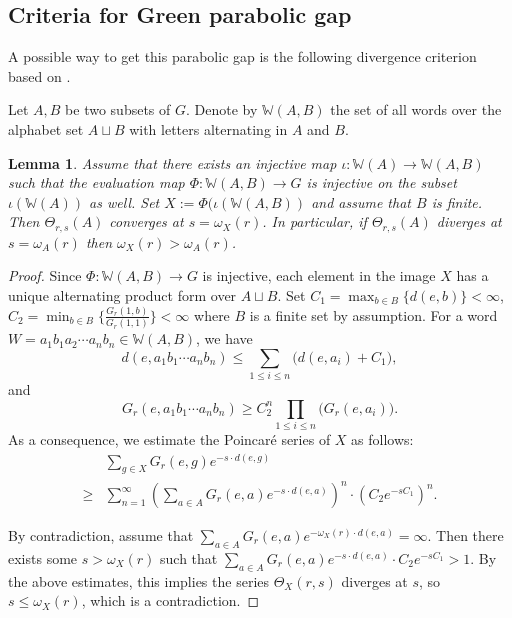 \documentclass{amsart}
\newtheorem{lem}[thm]{Lemma}
\theoremstyle{definition}
\theoremstyle{remark}
\begin{document}



\subsection{Criteria for Green parabolic gap}
A possible way to get this parabolic gap is the following divergence criterion based on \cite[Lemma~2.23]{YangSCC}. 


Let $A, B$ be two subsets of $G$.
Denote by $\mathbb W(A, B)$ the set of all words over the alphabet set $A\sqcup B$ with letters alternating in $A$ and $B$. 

\begin{lem}\label{degrowth}
Assume that there exists an injective  map $\iota:  \mathbb W(A)\to  \mathbb W(A, B)$ such that the evaluation map $\Phi: \mathbb W(A, B) \to G$ is injective on the subset $\iota(\mathbb W(A))$ as well. Set $X:=\Phi(\iota(\mathbb W(A,B))$  and assume that   $B$ is finite. Then   $\Theta_{r,s}(A)$ converges  at $s=\omega_{X}(r)$. In particular, if $\Theta_{r,s}(A)$ diverges at $s=\omega_{A}(r)$ 
then $\omega_{X}(r)
> \omega_{A}(r)$.
\end{lem}


\begin{proof}
Since $\Phi: \mathbb W(A, B) \to G$ is injective, each element in the image $X$ has a unique  alternating product form over $A\sqcup B$. Set  $C_1=\max_{b\in B} \{d(e, b)\}<\infty$, $C_2=\min_{b\in B} \Big\{\frac{G_r(1, b)}{G_r(1,1)}\Big\}<\infty$ where  $B$ is a finite set by assumption. For a word $W=a_1b_1a_2\cdots a_nb_n \in \mathbb W(A, B)$, we have $$
d(e, a_1b_1\cdots a_nb_n) \le \sum_{1\le i\le n} \big (d(e, a_i)+C_1\big),
$$and 
$$
G_r(e, a_1b_1\cdots a_nb_n) \ge C_2^n \prod_{1\le i\le n} \big (G_r(e, a_i) \big).
$$
As a consequence, we estimate the Poincar\'e series of $X$ as follows:
$$
\begin{array}{rl}
&\sum\limits_{g \in X} G_r(e,g)  e^{-s\cdot d(e, g)} \\
 
\ge &   \sum\limits_{n =1}^{\infty} \left(\sum\limits_{a \in A} G_r(e,a) e^{-s\cdot d (e, a)}\right)^n\cdot   (C_2e^{-sC_1}) ^n.
\end{array}
$$


By contradiction, assume that $\sum\limits_{a \in A} G_r(e,a) e^{-\omega_X(r) \cdot d (e, a)} = \infty$. Then there exists some $s >
\omega_X(r)$ such that $\sum\limits_{a \in A} G_r(e,a)  e^{-s\cdot d (e,
a)}\cdot C_2e^{-sC_1}
> 1$. By the above estimates, this implies the  series $\Theta_X(r,s)$ diverges at $s$, so $s\le \omega_X(r)$, which is a contradiction.
\end{proof}
\end{document}
